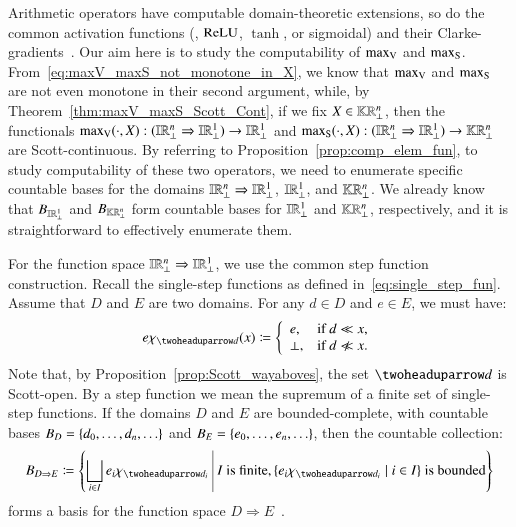 \documentclass[11pt,times]{article}
\begin{document}
Arithmetic operators have computable domain-theoretic extensions, so
do the common activation functions ({\eg}, $\ReLU$, $\tanh$, or
sigmoidal) and their
Clarke-gradients~\parencite{Edalat95:DT-fractals,Escardo96-tcs,Farjudian:Shrad:2007,EdalatLieutierPattinson:2013-MultiVar-Journal}. Our
aim here is to study the computability of $\maxV$ and
$\maxS$. From~\eqref{eq:maxV_maxS_not_monotone_in_X}, we know that
$\maxV$ and $\maxS$ are not even monotone in their second argument,
while, by Theorem~\ref{thm:maxV_maxS_Scott_Cont}, if we fix
$X \in \kCPPO{\R^n\lift}$, then the functionals
$\maxV(\cdot , X): (\intvaldom[\R^n\lift] \Rightarrow
\intvaldom[\R^1\lift]) \to \intvaldom[\R^1\lift]$ and
$\maxS( \cdot, X): (\intvaldom[\R^n\lift] \Rightarrow
\intvaldom[\R^1\lift]) \to \kCPPO{\R^n\lift}$ are Scott-continuous. By
referring to Proposition~\ref{prop:comp_elem_fun}, to study
computability of these two operators, we need to enumerate specific
countable bases for the domains
$\intvaldom[\R^n\lift] \Rightarrow \intvaldom[\R^1\lift]$,
$\intvaldom[\R^1\lift]$, and $\kCPPO{\R^n\lift}$. We already know that
$B_{\intvaldom[\R^1\lift]}$ and $B_{\kCPPO{\R^n\lift}}$ form countable
bases for $\intvaldom[\R^1\lift]$ and $\kCPPO{\R^n\lift}$,
respectively, and it is straightforward to effectively enumerate them.



  
  For the function space
  $\intvaldom[\R^n\lift] \Rightarrow \intvaldom[\R^1\lift]$, we use
  the common step function construction. Recall the single-step
  functions as defined in~\eqref{eq:single_step_fun}. Assume that $D$
  and $E$ are two domains. For any $d \in D$ and $e \in E$, we must
  have:
  \begin{equation*}
    e \chi_{\wayaboves{d}} (x) \defeq
    \left\{
    \begin{array}{ll}
      e, &  \text{if } d \ll x,\\
      \bot, & \text{if } d \not \ll x.
    \end{array}
  \right.
\end{equation*}  
%
Note that, by Proposition~\ref{prop:Scott_wayaboves}, the set
$\wayaboves{d}$ is Scott-open. By a step function we mean the supremum
of a finite set of single-step functions. If the domains $D$ and $E$
are bounded-complete, with countable bases
$B_D = \set{d_0, \ldots, d_n, \ldots}$ and
$B_E = \set{e_0, \ldots, e_n, \ldots}$, then the countable collection:
%
\begin{equation}
  \label{eq:B_D_to_E}
 B_{D \Rightarrow E} \defeq \setbarTall{\lub_{i \in I} e_i
   \chi_{\wayaboves{d_i}}}{I \text{ is finite}, \setbarNormal{e_i
   \chi_{\wayaboves{d_i}}}{i \in I} \text{ is bounded}}
\end{equation}
%
forms a basis for the function space
$D \Rightarrow E$~\parencite[Section~4]{AbramskyJung94-DT}.
\end{document}
